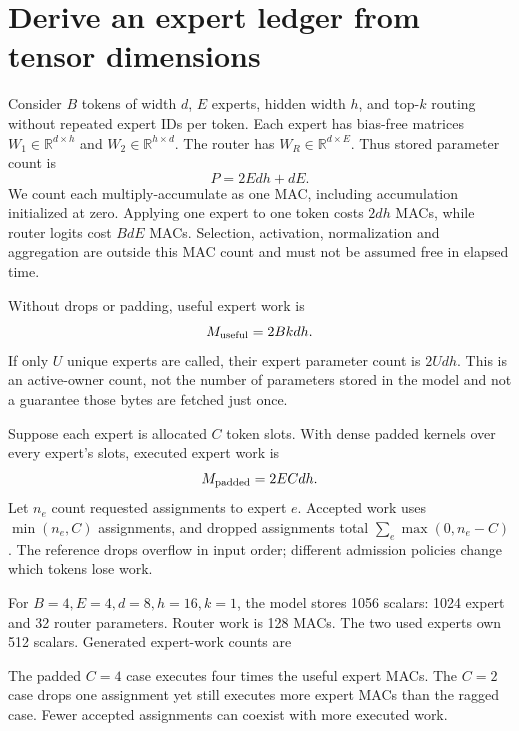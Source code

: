 \section{Derive an expert ledger from tensor dimensions}
Consider $B$ tokens of width $d$, $E$ experts, hidden width $h$, and top-$k$
routing without repeated expert IDs per token. Each expert has bias-free
matrices $W_1\in\mathbb R^{d\times h}$ and
$W_2\in\mathbb R^{h\times d}$. The router has $W_R\in\mathbb R^{d\times E}$.
Thus stored parameter count is
\begin{equation}
 P=2Edh+dE.
 \label{eq:params}
\end{equation}
We count each multiply-accumulate as one MAC, including accumulation initialized
at zero. Applying one expert to one token costs $2dh$ MACs, while router
logits cost $BdE$ MACs. Selection, activation, normalization and aggregation
are outside this MAC count and must not be assumed free in elapsed time.

Without drops or padding, useful expert work is
\begin{equation}
 M_{\rm useful}=2Bkdh.
 \label{eq:useful}
\end{equation}
If only $U$ unique experts are called, their expert parameter count is $2Udh$.
This is an active-owner count, not the number of parameters stored in the model
and not a guarantee those bytes are fetched just once.

Suppose each expert is allocated $C$ token slots. With dense padded kernels
over every expert's slots, executed expert work is
\begin{equation}
 M_{\rm padded}=2ECdh.
 \label{eq:padded}
\end{equation}
Let $n_e$ count requested assignments to expert $e$. Accepted work uses
$\min(n_e,C)$ assignments, and dropped assignments total
$\sum_e\max(0,n_e-C)$. The reference drops overflow in input order; different
admission policies change which tokens lose work.


For $B=4,E=4,d=8,h=16,k=1$, the model stores 1056 scalars:
1024 expert and 32 router parameters. Router work is 128 MACs.
The two used experts own 512 scalars. Generated expert-work counts are
\begin{center}\end{center}
The padded $C=4$ case executes four times the useful expert MACs. The $C=2$
case drops one assignment yet still executes more expert MACs than the ragged
case. Fewer accepted assignments can coexist with more executed work.

